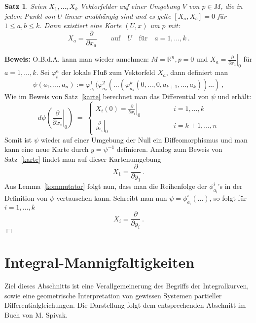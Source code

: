 \documentclass[12pt,a4paper]{article}
\def\R{\mathbb{R}}
\newtheorem{Satz}[Lemma]{Satz}
\def\proof{\noindent\textbf{Beweis:}\quad}
\def\qed{\quad\hfill\ensuremath{\Box}}
\begin{document}
\begin{Satz}\label{karte2}
Seien $X_1,\ldots, X_k$ Vektorfelder auf einer Umgebung $V$ von $p\in M$, die in jedem Punkt von
$U$ linear unabh\"angig sind und es gelte $[X_a, X_b]=0$ f\"ur $1\le a,b \le k$. Dann existiert
eine Karte $(U,x)$ um $p$ mit:
$$
X_a = \frac{\partial}{\partial x_a} \qquad \mbox{auf} \quad U \quad \mbox{f\"ur} \quad a = 1,\ldots, k \ .
$$
\end{Satz}
\proof
O.B.d.A. kann man wieder annehmen: $M=\R^n, p=0$ und $\left.X_a = \frac{\partial}{\partial x_a}\right|_{0}$
f\"ur $a=1,\ldots,k$. Sei $\varphi^a_t$ der lokale Flu\ss{} zum Vektorfeld $X_a$, dann definiert man
$$
\psi(a_1,\ldots, a_n) := \varphi^1_{a_1}(\varphi^2_{a_2}(\ldots (\varphi^k_{a_k}(0,\ldots,0,a_{k+1},\ldots,a_k))\ldots) \ ,
$$
Wie im Beweis von Satz~\ref{karte} berechnet man das Differential von $\psi$ und erh\"alt:
$$
d\psi \left( \left. \frac{\partial}{\partial x_i}\right|_0 \right)
\;=\;
\left\{
\begin{array}{ll}
X_i(0) =\left. \frac{\partial}{\partial x_i} \right|_0\qquad\qquad  & i = 1,\ldots, k \\[2ex]
\left.\frac{\partial}{\partial x_i}\right|_0    \qquad\qquad & i = k+1,\ldots, n
\end{array}
\right.
$$
Somit ist $\psi$ wieder auf einer Umgebung der Null ein Diffeomorphismus und man kann eine
neue Karte durch $y=\psi^{-1}$ definieren. Analog zum Beweis von Satz~\ref{karte} findet
man auf dieser Kartenumgebung
$$
X_1 = \frac{\partial}{\partial y_1} \ .
$$
Aus Lemma~\ref{kommutator} folgt nun, dass man die Reihenfolge der $\phi^i_{a_i}$'s in der
Definition von $\psi$ vertauschen kann. Schreibt man nun $\psi = \phi^i_{a_i}(\ldots)$, so
folgt f\"ur $i=1,\ldots, k$
$$
X_i = \frac{\partial}{\partial y_i} \ .
$$
\qed






\section{Integral-Mannigfaltigkeiten}

Ziel dieses Abschnitts ist eine Verallgemeinerung des Begriffs der Integralkurven, sowie eine
geometrische Interpretation von gewissen Systemen partieller Differentialgleichungen. Die
Darstellung folgt dem entsprechenden Abschnitt im Buch von M. Spivak.

\bigskip
\end{document}
